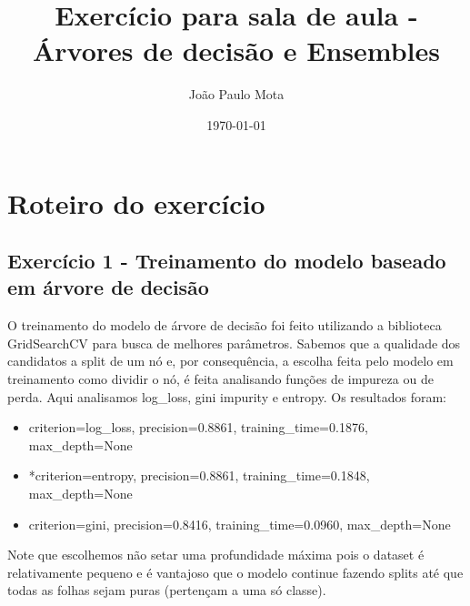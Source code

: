 \documentclass[11pt]{article}
\title{Exercício para sala de aula - Árvores de decisão e Ensembles}
\author{ João Paulo Mota }
\date{\today}
\begin{document}
\maketitle



\section{Roteiro do exercício}

\subsection{Exercício 1 - Treinamento do modelo baseado em árvore de decisão}
O treinamento do modelo de árvore de decisão foi feito utilizando a biblioteca GridSearchCV para busca de melhores parâmetros.
Sabemos que a qualidade dos candidatos a split de um nó e, por consequência, a escolha feita pelo modelo em treinamento  como dividir o nó, é feita analisando 
funções de impureza ou de perda.
Aqui analisamos log\_loss, gini impurity e entropy. Os resultados foram:

\begin{itemize}
  \item criterion=log\_loss, precision=0.8861, training\_time=0.1876, max\_depth=None
  \item *criterion=entropy, precision=0.8861, training\_time=0.1848, max\_depth=None
  \item criterion=gini, precision=0.8416, training\_time=0.0960, max\_depth=None
\end{itemize}

Note que escolhemos não setar uma profundidade máxima pois o dataset é relativamente pequeno e é vantajoso que o modelo continue fazendo splits até que todas as folhas sejam puras (pertençam a uma só classe).
\end{document}

